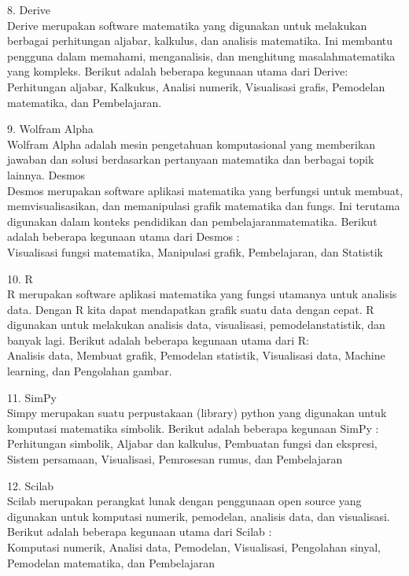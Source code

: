 \documentclass[a4paper,10pt]{article}
\begin{document}
\begin{eulernotebook}
\begin{eulercomment}
8. Derive\\
Derive merupakan software matematika yang digunakan untuk melakukan
berbagai perhitungan aljabar, kalkulus, dan analisis matematika. Ini
membantu pengguna dalam memahami, menganalisis, dan menghitung
masalahmatematika yang kompleks. Berikut adalah beberapa kegunaan
utama dari Derive:\\
Perhitungan aljabar, Kalkukus, Analisi numerik, Visualisasi grafis,
Pemodelan matematika, dan Pembelajaran.

9. Wolfram Alpha\\
Wolfram Alpha adalah mesin pengetahuan komputasional yang memberikan
jawaban dan solusi berdasarkan pertanyaan matematika dan berbagai
topik lainnya. Desmos\\
Desmos merupakan software aplikasi matematika yang berfungsi untuk
membuat, memvisualisasikan, dan memanipulasi grafik matematika dan
fungs. Ini terutama digunakan dalam konteks pendidikan dan
pembelajaranmatematika. Berikut adalah beberapa kegunaan utama dari
Desmos :\\
Visualisasi fungsi matematika, Manipulasi grafik, Pembelajaran, dan
Statistik

10. R\\
R merupakan software aplikasi matematika yang fungsi utamanya untuk
analisis data. Dengan R kita dapat mendapatkan grafik suatu data
dengan cepat. R digunakan untuk melakukan analisis data, visualisasi,
pemodelanstatistik, dan banyak lagi. Berikut adalah beberapa kegunaan
utama dari R:\\
Analisis data, Membuat grafik, Pemodelan statistik, Visualisasi data,
Machine learning, dan Pengolahan gambar.

11. SimPy\\
Simpy merupakan suatu perpustakaan (library) python yang digunakan
untuk komputasi matematika simbolik. Berikut adalah beberapa kegunaan
SimPy :\\
Perhitungan simbolik, Aljabar dan kalkulus, Pembuatan fungsi dan
ekspresi, Sistem persamaan, Visualisasi, Pemrosesan rumus, dan
Pembelajaran

12. Scilab\\
Scilab merupakan perangkat lunak dengan penggunaan open source yang
digunakan untuk komputasi numerik, pemodelan, analisis data, dan
visualisasi. Berikut adalah beberapa kegunaan utama dari Scilab :\\
Komputasi numerik, Analisi data, Pemodelan, Visualisasi, Pengolahan
sinyal, Pemodelan matematika, dan Pembelajaran


\end{eulercomment}
\end{eulernotebook}
\end{document}
